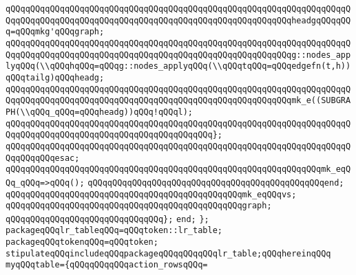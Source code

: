 \verb|qQQqqQQqqQQqqQQqqQQqqQQqqQQqqQQqqQQqqQQqqQQqqQQqqQQqqQQqqQQqqQQqqQQqqQQqqQQqqQQqqQQqqQQqqQQqqQQqqQQqqQQqqQQqqQQqqQQqqQQqqQQqqQQqheadgqQQqqQQq=qQQqmkg'qQQqgraph;|\newline
\newline
\verb|qQQqqQQqqQQqqQQqqQQqqQQqqQQqqQQqqQQqqQQqqQQqqQQqqQQqqQQqqQQqqQQqqQQqqQQqqQQqqQQqqQQqqQQqqQQqqQQqqQQqqQQqqQQqqQQqqQQqqQQqqQQqqQQqg::nodes_applyqQQq(\\qQQqhqQQq=qQQqg::nodes_applyqQQq(\\qQQqtqQQq=qQQqedgefn(t,h))qQQqtailg)qQQqheadg;|\newline
\newline
\verb|qQQqqQQqqQQqqQQqqQQqqQQqqQQqqQQqqQQqqQQqqQQqqQQqqQQqqQQqqQQqqQQqqQQqqQQqqQQqqQQqqQQqqQQqqQQqqQQqqQQqqQQqqQQqqQQqqQQqqQQqqQQqqQQqmk_e((SUBGRAPH(\\qQQq_qQQq=qQQqheadg))qQQq!qQQql);|\newline
\verb|qQQqqQQqqQQqqQQqqQQqqQQqqQQqqQQqqQQqqQQqqQQqqQQqqQQqqQQqqQQqqQQqqQQqqQQqqQQqqQQqqQQqqQQqqQQqqQQqqQQqqQQqqQQqqQQq};|\newline
\verb|qQQqqQQqqQQqqQQqqQQqqQQqqQQqqQQqqQQqqQQqqQQqqQQqqQQqqQQqqQQqqQQqqQQqqQQqqQQqqQQqesac;|\newline
\newline
\verb|qQQqqQQqqQQqqQQqqQQqqQQqqQQqqQQqqQQqqQQqqQQqqQQqqQQqqQQqqQQqqQQqmk_eqQQq_qQQq=>qQQq();|\newline
\verb|qQQqqQQqqQQqqQQqqQQqqQQqqQQqqQQqqQQqqQQqqQQqqQQqend;|\newline
\newline
\newline
\verb|qQQqqQQqqQQqqQQqqQQqqQQqqQQqqQQqqQQqqQQqqQQqqQQqmk_eqQQqvs;|\newline
\newline
\verb|qQQqqQQqqQQqqQQqqQQqqQQqqQQqqQQqqQQqqQQqqQQqqQQqgraph;|\newline
\verb|qQQqqQQqqQQqqQQqqQQqqQQqqQQqqQQq};|\newline
\verb|end;|\newline
\newline
\newline
\verb|};|\newline
\verb|packageqQQqlr_tableqQQq=qQQqtoken::lr_table;|\newline
\verb|packageqQQqtokenqQQq=qQQqtoken;|\newline
\verb|stipulateqQQqincludeqQQqpackageqQQqqQQqqQQqlr_table;qQQqhereinqQQq|\newline
\verb|myqQQqtable={qQQqqQQqqQQqaction_rowsqQQq=|\newline
